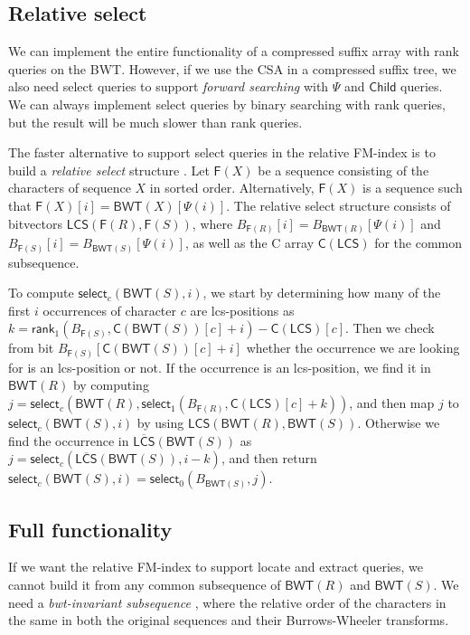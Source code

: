 \documentclass[a4paper,11pt]{llncs}
\renewcommand{\complement}[1]{\ensuremath{\overline{ #1 }}}
\newcommand{\BWT}{\textsf{BWT}}
\newcommand{\CSA}{\textsf{CSA}}
\newcommand{\mBWT}{\ensuremath{\mathsf{BWT}}}
\newcommand{\mF}{\ensuremath{\mathsf{F}}}
\newcommand{\C}{\textsf{C}}
\newcommand{\mC}{\ensuremath{\mathsf{C}}}
\newcommand{\mLCS}{\ensuremath{\mathsf{LCS}}}
\newcommand{\mCS}{\ensuremath{\complement{\mathsf{LCS}}}}
\newcommand{\locate}{\textsf{locate}}
\newcommand{\extract}{\textsf{extract}}
\newcommand{\rank}{\textsf{rank}}
\newcommand{\select}{\textsf{select}}
\newcommand{\mPsi}{\ensuremath{\mathsf{\Psi}}}
\newcommand{\mrank}{\ensuremath{\mathsf{rank}}}
\newcommand{\mselect}{\ensuremath{\mathsf{select}}}
\newcommand{\mChild}{\ensuremath{\mathsf{Child}}}
\begin{document}
\subsection{Relative select}

We can implement the entire functionality of a compressed suffix array with \rank{} queries on the \BWT. However, if we use the \CSA{} in a compressed suffix tree, we also need \select{} queries to support \emph{forward searching} with $\mathsf{\mPsi}$ and $\mChild$ queries. We can always implement \select{} queries by binary searching with \rank{} queries, but the result will be much slower than \rank{} queries.

The faster alternative to support \select{} queries in the relative FM-index is to build a \emph{relative select} structure \cite{Boucher2015}. Let $\mF(X)$ be a sequence consisting of the characters of sequence $X$ in sorted order. Alternatively, $\mF(X)$ is a sequence such that $\mF(X)[i] = \mBWT(X)[\mPsi(i)]$. The relative select structure consists of bitvectors $\mLCS(\mF(R), \mF(S))$, where $B_{\mF(R)}[i] = B_{\mBWT(R)}[\mPsi(i)]$ and $B_{\mF(S)}[i] = B_{\mBWT(S)}[\mPsi(i)]$, as well as the \C{} array $\mC(\mLCS)$ for the common subsequence.

To compute $\mselect_{c}(\mBWT(S), i)$, we start by determining how many of the first $i$ occurrences of character $c$ are lcs-positions as $k = \mrank_{1}(B_{\mF(S)}, \mC(\mBWT(S))[c] + i) - \mC(\mLCS)[c]$. Then we check from bit $B_{\mF(S)}[\mC(\mBWT(S))[c] + i]$ whether the occurrence we are looking for is an lcs-position or not. If the occurrence is an lcs-position, we find it in $\mBWT(R)$ by computing $j = \mselect_{c}(\mBWT(R), \mselect_{1}(B_{\mF(R)}, \mC(\mLCS)[c] + k))$, and then map $j$ to $\mselect_{c}(\mBWT(S), i)$ by using $\mLCS(\mBWT(R), \mBWT(S))$. Otherwise we find the occurrence in $\mCS(\mBWT(S))$ as $j = \mselect_{c}(\mCS(\mBWT(S)), i-k)$, and then return $\mselect_{c}(\mBWT(S), i) = \mselect_{0}(B_{\mBWT(S)}, j)$.

\subsection{Full functionality}

If we want the relative FM-index to support \locate{} and \extract{} queries, we cannot build it from any common subsequence of $\mBWT(R)$ and $\mBWT(S)$. We need a \emph{bwt-invariant subsequence} \cite{Belazzougui2014}, where the relative order of the characters in the same in both the original sequences and their Burrows-Wheeler transforms.
\end{document}

